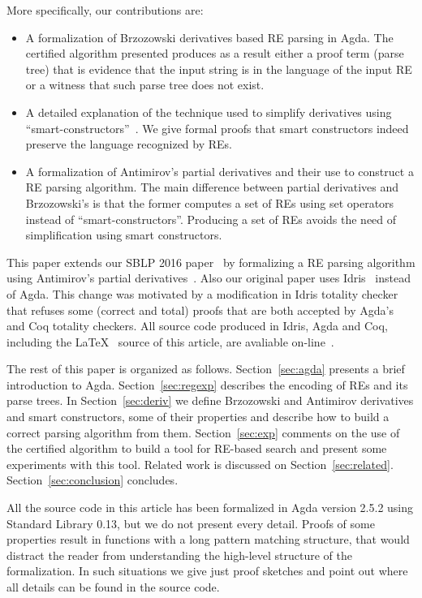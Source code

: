 \documentclass[fleqn,10pt]{SelfArx} %
\theoremstyle{definition}
\begin{document}
More specifically, our contributions are:
\begin{itemize}
  \item A formalization of Brzozowski derivatives based RE parsing in
    Agda. The certified algorithm presented produces as a result
    either a proof term (parse tree) that is evidence that the input
    string is in the language of the input RE or a witness that such
    parse tree does not exist.

  \item A detailed explanation of the technique used to simplify
    derivatives using ``smart-constructors''~\cite{Owens2009}.
    We give formal proofs that smart constructors indeed preserve
    the language recognized by REs.

  \item A formalization of Antimirov's partial derivatives and their use to
    construct a RE parsing algorithm. The main difference between
    partial derivatives and Brzozowski's is that the former computes a
    set of REs using set operators instead of ``smart-constructors''.
    Producing a set of REs avoids the need of simplification using
    smart constructors.
\end{itemize}

This paper extends our SBLP 2016 paper~\cite{Lopes2016} by formalizing
a RE parsing algorithm using Antimirov's partial
derivatives~\cite{Antimirov1996}.  Also our original paper uses
Idris~\cite{Brady2013} instead of Agda. This change was motivated by a
modification in Idris totality checker that refuses some (correct and
total) proofs that are both accepted by Agda's and Coq totality
checkers. All source code produced in Idris, Agda and Coq, including
the \LaTeX~ source of this article, are avaliable
on-line~\cite{regex-rep}.

The rest of this paper is organized as follows. Section~\ref{sec:agda}
presents a brief introduction to Agda. Section~\ref{sec:regexp}
describes the encoding of REs and its parse trees. In
Section~\ref{sec:deriv} we define Brzozowski and Antimirov derivatives
and smart constructors, some of their properties and describe how to
build a correct parsing algorithm from them. Section~\ref{sec:exp}
comments on the use of the certified algorithm to build a tool for
RE-based search and present some experiments with this tool. Related
work is discussed on
Section~\ref{sec:related}. Section~\ref{sec:conclusion} concludes.

All the source code in this article has been formalized in Agda
version 2.5.2 using Standard Library 0.13, but
we do not present every detail. Proofs of some properties result in
functions with a long pattern matching structure, that would distract
the reader from understanding the high-level structure of the
formalization. In such situations we give just proof sketches and point
out where all details can be found in the source code.
\end{document}
